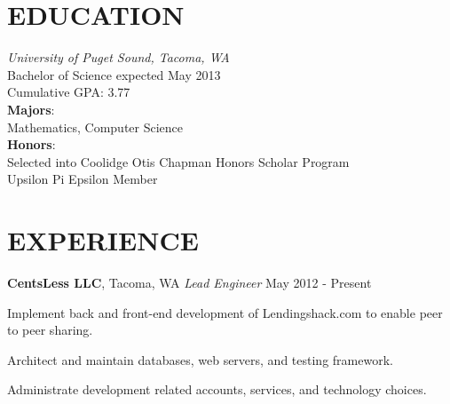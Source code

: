 \documentclass[line,margin]{res}
\newenvironment{itemize*}%
  {\begin{itemize}%
    \setlength{\parsep}{0pt}
    \setlength{\itemsep}{0pt}%
    \setlength{\parskip}{0pt}}%
  {\end{itemize}}
\begin{document}
\address{2214 N. Washington Street, Tacoma, WA 98406}
\address{kwenholz@pugetsound.edu\hspace*{2mm} \vline \hspace*{2mm} (406)546-9210}


\begin{resume}
\vspace*{.3cm}

\section{EDUCATION} {\sl University of Puget Sound, Tacoma, WA} \\
                Bachelor of Science
                expected May 2013 \\
                Cumulative GPA: 3.77\\
                \textbf{Majors}: \\
\hspace*{5mm}                Mathematics, Computer Science \\
                \textbf{Honors}:\\
\hspace*{5mm}   Selected into Coolidge Otis Chapman Honors Scholar Program\\
\hspace*{5mm}   Upsilon Pi Epsilon Member\\

\vspace*{.2cm}

\section{EXPERIENCE}

\textbf{CentsLess LLC}, Tacoma, WA
{\sl Lead Engineer} \hfill May 2012 - Present
\begin{itemize*}
    \item Implement back and front-end development of Lendingshack.com
        to enable peer to peer sharing.
    \item Architect and maintain databases, web servers, and testing framework.
    \item Administrate development related accounts, services, and technology
        choices.
\end{itemize*}


\end{resume}
\end{document}
